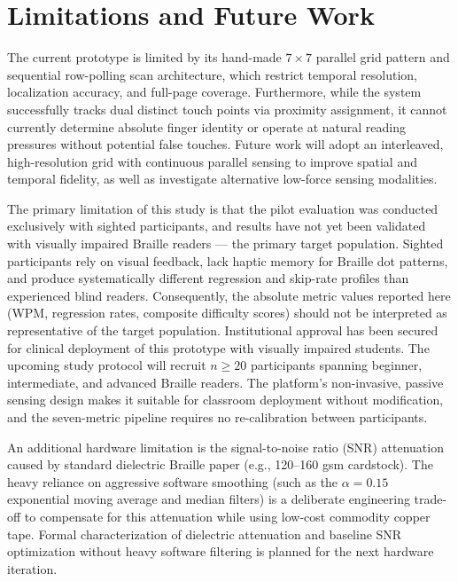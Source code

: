 \documentclass[conference]{IEEEtran}
\begin{document}
    \section{Limitations and Future Work}
    \label{sec:limitations}

    

    The current prototype is limited by its hand-made $7\times7$ parallel grid pattern and sequential row-polling scan architecture, which restrict temporal resolution, localization accuracy, and full-page coverage.
    Furthermore, while the system successfully tracks dual
    distinct touch points via proximity assignment, it cannot currently determine
    absolute finger identity or operate at natural reading pressures without
    potential false touches. Future work will adopt an interleaved, high-resolution
    grid with continuous parallel sensing to improve spatial and temporal fidelity,
    as well as investigate alternative low-force sensing modalities.



    The primary limitation of this study is that the pilot evaluation was
    conducted exclusively with sighted participants, and results have not yet
    been validated with visually impaired Braille readers --- the primary target
    population. Sighted participants rely on visual feedback, lack haptic memory
    for Braille dot patterns, and produce systematically different regression and
    skip-rate profiles than experienced blind readers. Consequently, the absolute
    metric values reported here (WPM, regression rates, composite difficulty
    scores) should not be interpreted as representative of the target population.
    Institutional approval has been secured for clinical deployment of this prototype with visually impaired students. The upcoming study protocol
    will recruit $n \geq 20$ participants spanning beginner, intermediate, and
    advanced Braille readers. The platform's non-invasive, passive sensing design
    makes it suitable for classroom deployment without modification, and the
    seven-metric pipeline requires no re-calibration between participants.

    An additional hardware limitation is the signal-to-noise ratio (SNR) attenuation caused by standard dielectric Braille paper (e.g., 120--160 gsm cardstock). The heavy reliance on aggressive software smoothing (such as the $\alpha = 0.15$ exponential moving average and median filters) is a deliberate engineering trade-off to compensate for this attenuation while using low-cost commodity copper tape. Formal characterization of dielectric attenuation and baseline SNR optimization without heavy software filtering is planned for the next hardware iteration.
\end{document}
